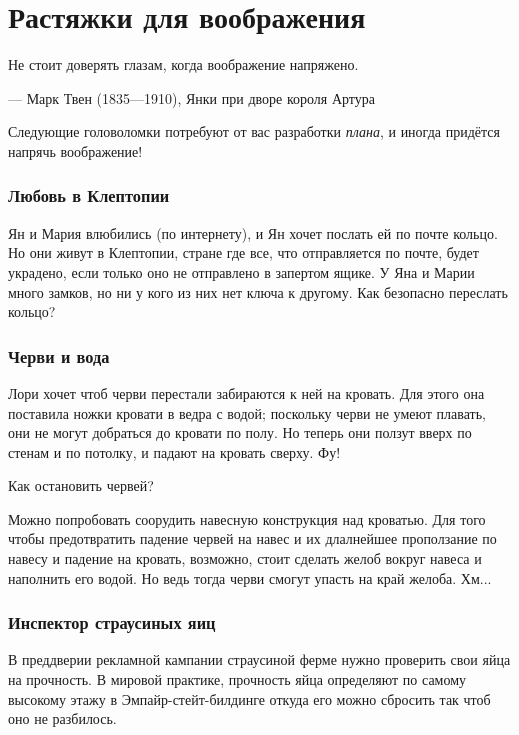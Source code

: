 \chapter{Растяжки для воображения}


\setlength{\epigraphwidth}{.80\textwidth}
\epigraph{Не стоит доверять глазам, когда воображение напряжено.
}{--- Марк Твен (1835---1910), Янки при дворе короля Артура}

Следующие головоломки потребуют от вас разработки \emph{плана},
и иногда придётся напрячь воображение!

\subsection*{Любовь в Клептопии}

Ян и Мария влюбились (по интернету), и Ян хочет послать ей по почте кольцо.
Но они живут в Клептопии, стране где все, что отправляется по почте, будет украдено, если только оно не отправлено в запертом ящике.
У Яна и Марии много замков, но ни у кого из них нет ключа к другому.
Как безопасно переслать кольцо?

\subsection*{Черви и вода}

Лори хочет чтоб черви перестали забираются к ней на кровать.
Для этого она поставила ножки кровати в ведра с водой;
поскольку черви не умеют плавать, они не могут добраться до кровати по полу.
Но теперь они ползут вверх по стенам и по потолку, и падают на кровать сверху.
Фу!

Как остановить червей?

Можно попробовать соорудить навесную конструкция над кроватью.
Для того чтобы предотвратить падение червей на навес и их длалнейшее проползание по навесу и падение на кровать, возможно, стоит сделать желоб вокруг навеса и наполнить его водой.
Но ведь тогда черви смогут упасть на край желоба.
Хм...

\subsection*{Инспектор страусиных яиц}

В преддверии рекламной кампании страусиной ферме нужно проверить свои яйца на прочность.
В мировой практике, прочность яйца определяют по самому высокому этажу в Эмпайр-стейт-билдинге откуда его можно сбросить так чтоб оно не разбилось.

